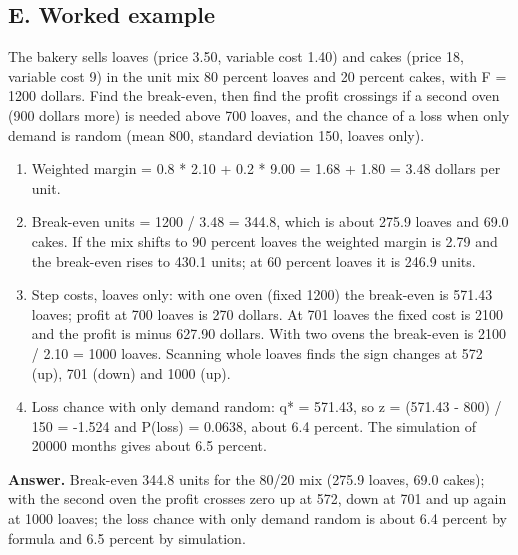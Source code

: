 \documentclass[11pt,a4paper]{article}
\begin{document}
\subsection*{E. Worked example}
The bakery sells loaves (price 3.50, variable cost 1.40) and cakes (price 18, variable cost 9) in the unit mix 80 percent loaves and 20 percent cakes, with F = 1200 dollars. Find the break-even, then find the profit crossings if a second oven (900 dollars more) is needed above 700 loaves, and the chance of a loss when only demand is random (mean 800, standard deviation 150, loaves only).
\begin{enumerate}[nosep]
\item Weighted margin = 0.8 * 2.10 + 0.2 * 9.00 = 1.68 + 1.80 = 3.48 dollars per unit.
\item Break-even units = 1200 / 3.48 = 344.8, which is about 275.9 loaves and 69.0 cakes. If the mix shifts to 90 percent loaves the weighted margin is 2.79 and the break-even rises to 430.1 units; at 60 percent loaves it is 246.9 units.
\item Step costs, loaves only: with one oven (fixed 1200) the break-even is 571.43 loaves; profit at 700 loaves is 270 dollars. At 701 loaves the fixed cost is 2100 and the profit is minus 627.90 dollars. With two ovens the break-even is 2100 / 2.10 = 1000 loaves. Scanning whole loaves finds the sign changes at 572 (up), 701 (down) and 1000 (up).
\item Loss chance with only demand random: q* = 571.43, so z = (571.43 - 800) / 150 = -1.524 and P(loss) = 0.0638, about 6.4 percent. The simulation of 20000 months gives about 6.5 percent.
\end{enumerate}
\textbf{Answer.} Break-even 344.8 units for the 80/20 mix (275.9 loaves, 69.0 cakes); with the second oven the profit crosses zero up at 572, down at 701 and up again at 1000 loaves; the loss chance with only demand random is about 6.4 percent by formula and 6.5 percent by simulation.
\end{document}
